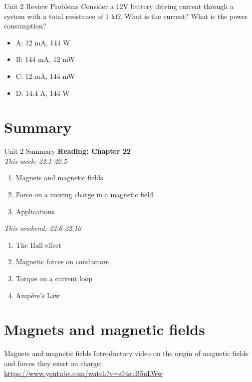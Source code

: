 \documentclass{beamer}
\begin{document}
\begin{frame}{Unit 2 Review Problems}
Consider a 12V battery driving current through a system with a total resistance of $1$ k$\Omega$.  What is the current?  What is the power consumption? 
\begin{itemize}
\item A: 12 mA, 144 W
\item B: 144 mA, 12 mW
\item C: 12 mA, 144 mW
\item D: 14.4 A, 144 W
\end{itemize}
\end{frame}

\section{Summary}

\begin{frame}{Unit 2 Summary}
\textbf{Reading: Chapter 22} \\ \vspace{0.5cm}
\textit{This week: 22.1-22.5}
\begin{enumerate}
\item Magnets and magnetic fields
\item Force on a moving charge in a magnetic field
\item Applications
\end{enumerate}
\textit{This weekend: 22.6-22.10}
\begin{enumerate}
\item The Hall effect
\item Magnetic forces on conductors
\item Torque on a current loop
\item Amp\`{e}re's Law
\end{enumerate}
\end{frame}

\section{Magnets and magnetic fields}

\begin{frame}{Magnets and magnetic fields}
Introductory video on the origin of magnetic fields and forces they exert on charge: \\ \vspace{0.5cm}
\url{https://www.youtube.com/watch?v=s94suB5uLWw}
\end{frame}
\end{document}
